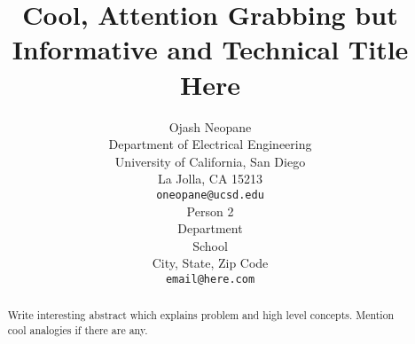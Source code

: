 \documentclass{article}
\title{Cool, Attention Grabbing but Informative and Technical Title Here}
\author{
  Ojash Neopane\\
  Department of Electrical Engineering\\
  University of California, San Diego\\
  La Jolla, CA 15213 \\
  \texttt{oneopane@ucsd.edu} \\
  \And
  Person 2 \\
  Department\\
  School\\
  City, State, Zip Code \\
  \texttt{email@here.com} \\
}
\begin{document}

\maketitle



\begin{abstract}
Write interesting abstract which explains problem and high level concepts.  Mention cool analogies if there are any.
\end{abstract}

\ifShowOutline
    
\fi

\ifExtendedAbstract
    
    
    
    
    
\fi



\end{document}
